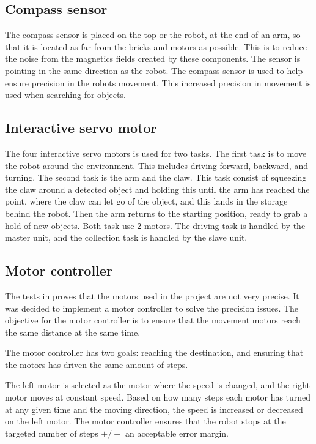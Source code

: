 \subsection{Compass sensor}
The compass sensor is placed on the top or the robot, at the end of an arm, so that it is located as far from the bricks and motors as possible. This is to reduce the noise from the magnetics fields created by these components. The sensor is pointing in the same direction as the robot. The compass sensor is used to help ensure precision in the robots movement. This increased precision in movement is used when searching for objects.

\subsection{Interactive servo motor}
The four interactive servo motors is used for two tasks. The first task is to move the robot around the environment. This includes driving forward, backward, and turning. The second task is the arm and the claw. This task consist of squeezing the claw around a detected object and holding this until the arm has reached the point, where the claw can let go of the object, and this lands in the storage behind the robot. Then the arm returns to the starting position, ready to grab a hold of new objects. Both task use 2 motors. The driving task is handled by the master unit, and the collection task is handled by the slave unit.

\subsection{Motor controller}\label{sec:design-motor-controller}
The tests in  proves that the motors used in the project are not very precise. It was decided to implement a motor controller to solve the precision issues. The objective for the motor controller is to ensure that the movement motors reach the same distance at the same time. 

The motor controller has two goals: reaching the destination, and ensuring that the motors has driven the same amount of steps. 

The left motor is selected as the motor where the speed is changed, and the right motor moves at constant speed. Based on how many steps each motor has turned at any given time and the moving direction, the speed is increased or decreased on the left motor. The motor controller ensures that the robot stops at the targeted number of steps $+/-$ an acceptable error margin.

